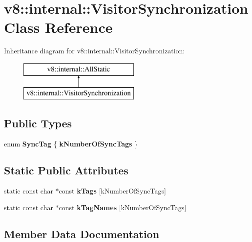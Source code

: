 \hypertarget{classv8_1_1internal_1_1_visitor_synchronization}{}\section{v8\+:\+:internal\+:\+:Visitor\+Synchronization Class Reference}
\label{classv8_1_1internal_1_1_visitor_synchronization}
Inheritance diagram for v8\+:\+:internal\+:\+:Visitor\+Synchronization\+:\begin{figure}[H]
\begin{center}
\leavevmode
\includegraphics[height=2.000000cm]{classv8_1_1internal_1_1_visitor_synchronization}
\end{center}
\end{figure}
\subsection*{Public Types}
\begin{DoxyCompactItemize}
\item 
enum {\bfseries Sync\+Tag} \{ {\bfseries k\+Number\+Of\+Sync\+Tags}
 \}\hypertarget{classv8_1_1internal_1_1_visitor_synchronization_a0971ddb5cd5a8da91d074f648187da7a}{}\label{classv8_1_1internal_1_1_visitor_synchronization_a0971ddb5cd5a8da91d074f648187da7a}

\end{DoxyCompactItemize}
\subsection*{Static Public Attributes}
\begin{DoxyCompactItemize}
\item 
static const char $\ast$const {\bfseries k\+Tags} \mbox{[}k\+Number\+Of\+Sync\+Tags\mbox{]}
\item 
static const char $\ast$const {\bfseries k\+Tag\+Names} \mbox{[}k\+Number\+Of\+Sync\+Tags\mbox{]}
\end{DoxyCompactItemize}


\subsection{Member Data Documentation}
